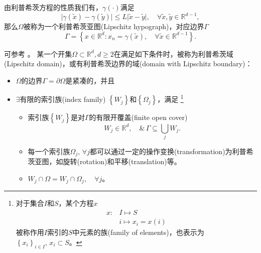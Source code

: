 由利普希茨方程的性质我们有，$\gamma(\cdot)$满足
\begin{equation*}
  \big| \gamma(\tilde x) - \gamma (\tilde y) \big|
  \le L \big| \tilde{x} - \tilde{y} \big|, \quad \forall \tilde{x},\tilde{y} \in \mathbb{R}^{d-1},
\end{equation*}
那么$\Omega$被称为一个利普希茨亚图(Lipschitz hypograph)，对应边界$\Gamma$
\begin{equation*}
  \Gamma = \left\{
  x \in \mathbb{R}^d: x_n = \gamma(\tilde{x}), \quad \forall \tilde{x} \in \mathbb{R}^{d-1}
  \right\}.
\end{equation*}

\begin{definition}[利普希茨域]
  \label{definition:bvp-lipschitz-domain-def}
可参考 \cite{Heinonen:2005wq}。  某一个开集$\Omega \subset \mathbb{R}^d, d \ge 2$在满足如下条件时，被称为利普希茨域(Lipschitz domain)，或有利普希茨边界的域(domain with Lipschitz boundary)：
  \begin{itemize}
    \item $\Omega$的边界$\Gamma = \partial \Omega$是紧凑的，并且
    \item $\exists$有限的索引族(index family)  $\left\{W_j\right\}$和$\left\{ \Omega_j\right\}$，满足
    \footnote{对于集合$I$和$S$，某个方程$x$
    \begin{equation*}
    \begin{split}
      x:&I \mapsto S \\
      &i \mapsto x_i = x(i)
    \end{split}
  \end{equation*}被称作用$I$索引的$S$中元素的族(family of elements)\index{}，也表示为$\left\{ x_i \right\}_{i \in I},\, x_i \subset S$。
  }
  \begin{itemize}
    \item 索引族$\left\{ W_j \right\}$是对$\Gamma$的有限开覆盖(finite open cover)
    \begin{equation*}
      W_j \in \mathbb{R}^d, \quad \& \, \Gamma \subseteq \bigcup_j W_j.
    \end{equation*}
    \item 每一个索引族$\Omega_j, \, \forall j$都可以通过一定的操作变换(transformation)为利普希茨亚图，如旋转(rotation)和平移(translation)等。
    \item $W_j \cap \Omega = W_j \cap \Omega_j, \quad \forall j$。
  \end{itemize}
  \end{itemize}
\end{definition}

